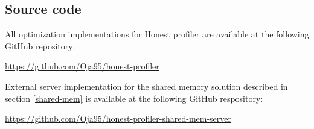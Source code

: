 \documentclass[..thesis.tex]{subfiles}
\begin{document}
\subsection{Source code}
All optimization implementations for Honest profiler are available at the following GitHub repository:

\url{https://github.com/Oja95/honest-profiler}

External server implementation for the shared memory solution described in section \ref{shared-mem} is available at the following GitHub respository:

\url{https://github.com/Oja95/honest-profiler-shared-mem-server}

\newpage
\end{document}
